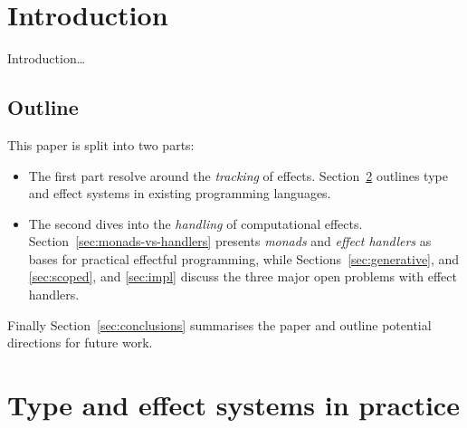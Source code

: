 \documentclass[preprint,9pt,numbers]{sigplanconf}
\title{\thetitle{}}
\begin{document}
\makeatletter
\def\@copyrightspace{\relax}
\makeatother

\preprintfooter{} %

\setlength{\pdfpageheight}{\paperheight}
\setlength{\pdfpagewidth}{\paperwidth}

\maketitle

\begin{abstract}
  The very nature of programs is effectful: given an input; produce an
  output.
\end{abstract}

\section{Introduction}
Introduction\dots

\subsection{Outline}
This paper is split into two parts:
\begin{itemize}
\item The first part resolve around the \emph{tracking} of
  effects. Section~\ref{sec:effpractice} outlines type and effect
  systems in existing programming languages.
\item The second dives into the \emph{handling} of computational
  effects. Section~\ref{sec:monads-vs-handlers} presents \emph{monads}
  and \emph{effect handlers} as bases for practical effectful
  programming, while Sections~\ref{sec:generative}, and
  \ref{sec:scoped}, and \ref{sec:impl} discuss the three major open
  problems with effect handlers.
\end{itemize}
Finally Section~\ref{sec:conclusions} summarises the paper and outline
potential directions for future work.


\section{Type and effect systems in practice}
\label{sec:effpractice}
\end{document}
